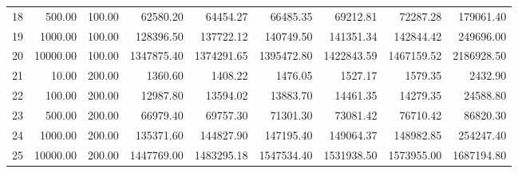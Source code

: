 \begin{table}[ht]
\begin{tabular}{rrrrrrrrr}
  18 & 500.00 & 100.00 & 62580.20 & 64454.27 & 66485.35 & 69212.81 & 72287.28 & 179061.40 \\ 
  19 & 1000.00 & 100.00 & 128396.50 & 137722.12 & 140749.50 & 141351.34 & 142844.42 & 249696.00 \\ 
  20 & 10000.00 & 100.00 & 1347875.40 & 1374291.65 & 1395472.80 & 1422843.59 & 1467159.52 & 2186928.50 \\ 
  21 & 10.00 & 200.00 & 1360.60 & 1408.22 & 1476.05 & 1527.17 & 1579.35 & 2432.90 \\ 
  22 & 100.00 & 200.00 & 12987.80 & 13594.02 & 13883.70 & 14461.35 & 14279.35 & 24588.80 \\ 
  23 & 500.00 & 200.00 & 66979.40 & 69757.30 & 71301.30 & 73081.42 & 76710.42 & 86820.30 \\ 
  24 & 1000.00 & 200.00 & 135371.60 & 144827.90 & 147195.40 & 149064.37 & 148982.85 & 254247.40 \\ 
  25 & 10000.00 & 200.00 & 1447769.00 & 1483295.18 & 1547534.40 & 1531938.50 & 1573955.00 & 1687194.80 \\ 
   \hline
\end{tabular}
\end{table}
